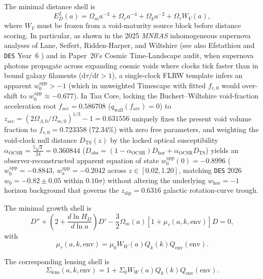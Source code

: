 \documentclass[11pt]{article}
\begin{document}
The minimal distance shell is
\begin{equation}
E_D^2(a)
=
\Omega_m a^{-3}
+\Omega_r a^{-4}
+\Omega_k a^{-2}
+\Omega_\tau W_V(a),
\end{equation}
where \(W_V\) must be frozen from a void-maturity source block before distance
scoring. In particular, as shown in the 2025 \textit{MNRAS} inhomogeneous supernova analyses of Lane, Seifert, Ridden-Harper, and Wiltshire \cite{LaneWiltshire2025MNRAS,SeifertWiltshire2025MNRAS} (see also Efstathiou \cite{Efstathiou2025SN} and \texttt{DES} Year~6 \cite{DES2026DynDE}) and in Paper~20's Cosmic Time-Landscape audit, when supernova photons propagate across expanding cosmic voids where clocks tick faster than in bound galaxy filaments ($\mathrm{d}\tau/\mathrm{d}t > 1$), a single-clock FLRW template infers an apparent $w_0^{\mathrm{app}} > -1$ (which in unweighted Timescape with fitted $f_{v,0}$ would over-shift to $w_0^{\mathrm{app}} \approx -0.677$). In Tau Core, locking the Buchert--Wiltshire void-fraction acceleration root $f_{\mathrm{acc}} = 0.586708$ ($q_{\mathrm{wall}}(f_{\mathrm{acc}}) = 0$) to $z_{\mathrm{acc}} = (2\Omega_{\Lambda,0}/\Omega_{m,0})^{1/3} - 1 = 0.631556$ uniquely fixes the present void volume fraction to $f_{v,0} = 0.723358$ ($72.34\%$) with zero free parameters, and weighting the void-clock null distance $D_{\mathrm{TS}}(z)$ by the locked optical susceptibility $\alpha_{\mathrm{OCSR}} = \frac{5\sqrt{3}}{24} = 0.360844$ ($D_{\mathrm{obs}} = (1-\alpha_{\mathrm{OCSR}})D_{\mathrm{hor}} + \alpha_{\mathrm{OCSR}}D_{\mathrm{TS}}$) yields an observer-reconstructed apparent equation of state $w_0^{\mathrm{app}}(0) = -0.8996$ ($w_0^{\mathrm{app}} = -0.8843$, $w_a^{\mathrm{app}} = -0.2042$ across $z \in [0.02,1.20]$, matching \texttt{DES} 2026 $w_0 = -0.82 \pm 0.05$ within $0.10\sigma$) without altering the underlying $w_{\mathrm{hor}} = -1$ horizon background that governs the $z_{\mathrm{dip}} = 0.6316$ galactic rotation-curve trough.

The minimal growth shell is
\begin{equation}
D''
+
\left(2+\frac{d\ln H_D}{d\ln a}\right)D'
-
\frac{3}{2}\Omega_m(a)
\left[1+\mu_\tau(a,k,\mathrm{env})\right]D
=0,
\end{equation}
with
\begin{equation}
\mu_\tau(a,k,\mathrm{env})
=
\mu_0 W_W(a)Q_k(k)Q_{\mathrm{env}}(\mathrm{env}).
\end{equation}

The corresponding lensing shell is
\begin{equation}
\Sigma_{\mathrm{lens}}(a,k,\mathrm{env})
=
1+\Sigma_0 W_W(a)Q_k(k)Q_{\mathrm{env}}(\mathrm{env}).
\end{equation}
\end{document}
